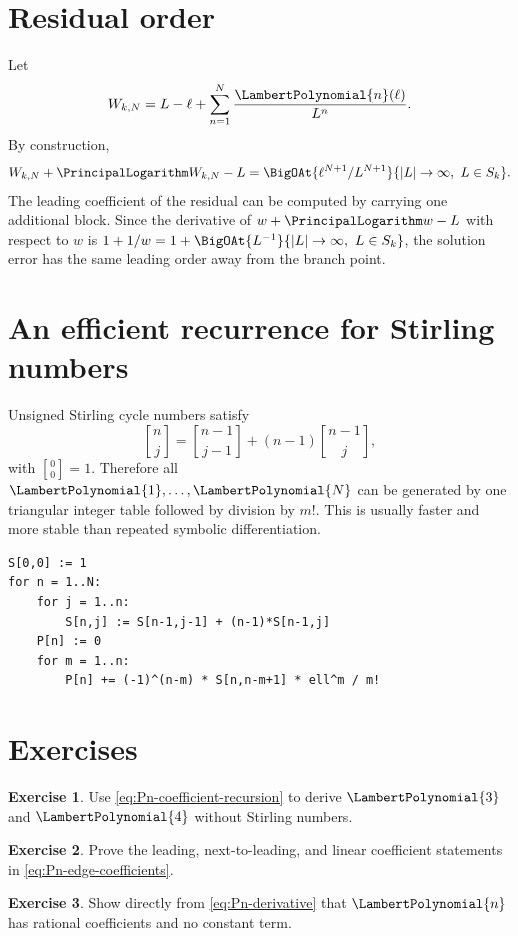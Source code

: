 \documentclass[11pt,openany]{book}
\theoremstyle{definition}
\newtheorem{exercise}{Exercise}[chapter]
\theoremstyle{plain}
\theoremstyle{remark}
\newcommand{\stirlingone}[2]{\genfrac{[}{]}{0pt}{}{#1}{#2}}
\begin{document}
\section{Residual order}
Let
\begin{equation}\label{eq:WN}
 W_{k,N}=L-\ell+\sum_{n=1}^{N}\frac{\LambertPolynomial{n}(\ell)}{L^n}.
\end{equation}
By construction,
\begin{equation}\label{eq:W-residual-order}
 W_{k,N}+\PrincipalLogarithm W_{k,N}-L
 =\BigOAt{\ell^{N+1}/L^{N+1}}{|L|\to\infty,\ L\in S_k}.
\end{equation}
The leading coefficient of the residual can be computed by carrying one additional block. Since the derivative of \(w+\PrincipalLogarithm w-L\) with respect to \(w\) is \(1+1/w=1+\BigOAt{L^{-1}}{|L|\to\infty,\ L\in S_k}\), the solution error has the same leading order away from the branch point.

\section{An efficient recurrence for Stirling numbers}
Unsigned Stirling cycle numbers satisfy
\begin{equation}\label{eq:stirling-recurrence}
 \stirlingone{n}{j}
 =\stirlingone{n-1}{j-1}
 +(n-1)\stirlingone{n-1}{j},
\end{equation}
with \(\stirlingone{0}{0}=1\). Therefore all \(\LambertPolynomial{1},\ldots,\LambertPolynomial{N}\) can be generated by one triangular integer table followed by division by \(m!\). This is usually faster and more stable than repeated symbolic differentiation.

\begin{lstlisting}[style=pseudo,caption={Generating the Lambert coefficient polynomials}]
S[0,0] := 1
for n = 1..N:
    for j = 1..n:
        S[n,j] := S[n-1,j-1] + (n-1)*S[n-1,j]
    P[n] := 0
    for m = 1..n:
        P[n] += (-1)^(n-m) * S[n,n-m+1] * ell^m / m!
\end{lstlisting}

\section{Exercises}
\begin{exercise}
Use \cref{eq:Pn-coefficient-recursion} to derive \(\LambertPolynomial{3}\) and \(\LambertPolynomial{4}\) without Stirling numbers.
\end{exercise}
\begin{exercise}
Prove the leading, next-to-leading, and linear coefficient statements in \cref{eq:Pn-edge-coefficients}.
\end{exercise}
\begin{exercise}
Show directly from \cref{eq:Pn-derivative} that \(\LambertPolynomial{n}\) has rational coefficients and no constant term.
\end{exercise}
\end{document}
